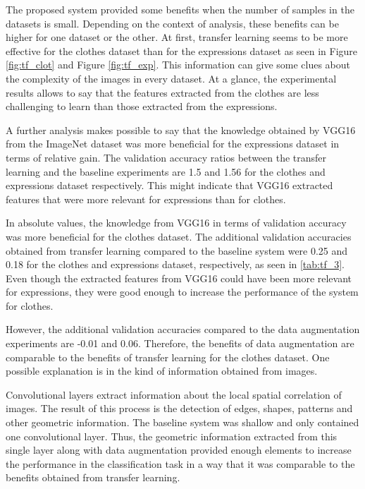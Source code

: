 \documentclass{article}
\begin{document}
The proposed system provided some benefits when the number of samples in the datasets is small. Depending on the context of analysis, these benefits can be higher for one dataset or the other. At first, transfer learning seems to be more effective for the clothes dataset than for the expressions dataset as seen in Figure \ref{fig:tf_clot} and Figure \ref{fig:tf_exp}. This information can give some clues about the complexity of the images in every dataset. At a glance, the experimental results allows to say that the features extracted from the clothes are less challenging to learn than those extracted from the expressions.

A further analysis makes possible to say that the knowledge obtained by VGG16 from the ImageNet dataset was more beneficial for the expressions dataset in terms of relative gain. The validation accuracy ratios between the transfer learning and the baseline experiments are 1.5 and 1.56 for the clothes and expressions dataset respectively. This might indicate that VGG16 extracted features that were more relevant for expressions than for clothes.

In absolute values, the knowledge from VGG16 in terms of validation accuracy was more beneficial for the clothes dataset. The additional validation accuracies obtained from transfer learning compared to the baseline system were 0.25 and 0.18 for the clothes and expressions dataset, respectively, as seen in \ref{tab:tf_3}. Even though the extracted features from VGG16 could have been more relevant for expressions, they were good enough to increase the performance of the system for clothes.

However, the additional validation accuracies compared to the data augmentation experiments are -0.01 and 0.06. Therefore, the benefits of data augmentation are comparable to the benefits of transfer learning for the clothes dataset. One possible explanation is in the kind of information obtained from images. 

Convolutional layers extract information about the local spatial correlation of images. The result of this process is the detection of edges, shapes, patterns and other geometric information. The baseline system was shallow and only contained one convolutional layer. Thus, the geometric information extracted from this single layer along with data augmentation provided enough elements to increase the performance in the classification task in a way that it was comparable to the benefits obtained from transfer learning. 
\end{document}
